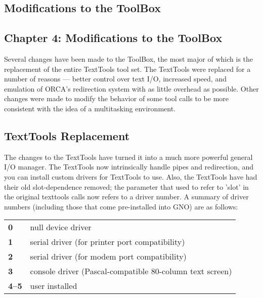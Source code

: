 \documentclass{report}
\begin{document}
%
%

\begin{latexonly}
\chapter{Modifications to the ToolBox}
\end{latexonly}
\begin{htmlonly}
\chapter{Chapter 4:  Modifications to the ToolBox}
\end{htmlonly}

Several changes have been made to the
ToolBox, the most major of which is the replacement of the entire
TextTools tool set. The TextTools were replaced for a number of
reasons --- better control over text I/O, increased speed, and
emulation of ORCA's redirection system with as little overhead as
possible. Other changes were made to modify the behavior of some
tool calls to be more consistent with the idea of a multitasking
environment.

\section{TextTools Replacement}

The changes to the TextTools have turned it
into a much more powerful general I/O manager. The TextTools now
intrinsically handle pipes and redirection, and you can install
custom drivers for TextTools to use. Also, the TextTools have had
their old slot-dependence removed; the parameter that used to
refer to 'slot' in the original texttools calls now refers to a
driver number. A summary of driver numbers (including those that
come pre-installed into GNO) are as follows:

\begin{tabular}{ll}
\bf{0}		& null device driver \\
\bf{1}		& serial driver (for printer port compatibility) \\
\bf{2}		& serial driver (for modem port compatibility) \\
\bf{3}		& console driver (Pascal-compatible 80-column text screen) \\
\bf{4--5}	& user installed \\
\end{tabular}
\end{document}
